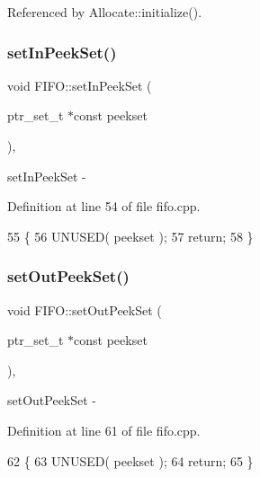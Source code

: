 Referenced by Allocate\+::initialize().

\hypertarget{class_f_i_f_o_abccc27a45f6590bb8529513c411b0b5a}{}\label{class_f_i_f_o_abccc27a45f6590bb8529513c411b0b5a} 
\subsubsection{\texorpdfstring{set\+In\+Peek\+Set()}{setInPeekSet()}}
{\footnotesize\ttfamily void F\+I\+F\+O\+::set\+In\+Peek\+Set (\begin{DoxyParamCaption}\item[{ptr\+\_\+set\+\_\+t $\ast$const}]{peekset }\end{DoxyParamCaption})\hspace{0.3cm}{\ttfamily [protected]}, {\ttfamily [virtual]}}

set\+In\+Peek\+Set -\/ 

Definition at line 54 of file fifo.\+cpp.


\begin{DoxyCode}
55 \{
56     UNUSED( peekset );
57     \textcolor{keywordflow}{return};
58 \}
\end{DoxyCode}
\hypertarget{class_f_i_f_o_aaf19d035ab4e130dbcd78c576cdf0dae}{}\label{class_f_i_f_o_aaf19d035ab4e130dbcd78c576cdf0dae} 
\subsubsection{\texorpdfstring{set\+Out\+Peek\+Set()}{setOutPeekSet()}}
{\footnotesize\ttfamily void F\+I\+F\+O\+::set\+Out\+Peek\+Set (\begin{DoxyParamCaption}\item[{ptr\+\_\+set\+\_\+t $\ast$const}]{peekset }\end{DoxyParamCaption})\hspace{0.3cm}{\ttfamily [protected]}, {\ttfamily [virtual]}}

set\+Out\+Peek\+Set -\/ 

Definition at line 61 of file fifo.\+cpp.


\begin{DoxyCode}
62 \{
63     UNUSED( peekset );
64     \textcolor{keywordflow}{return};
65 \}
\end{DoxyCode}
\hypertarget{class_f_i_f_o_a6d7f0cf28c0eba5eaa12c347734dbdf2}{}\label{class_f_i_f_o_a6d7f0cf28c0eba5eaa12c347734dbdf2} 

